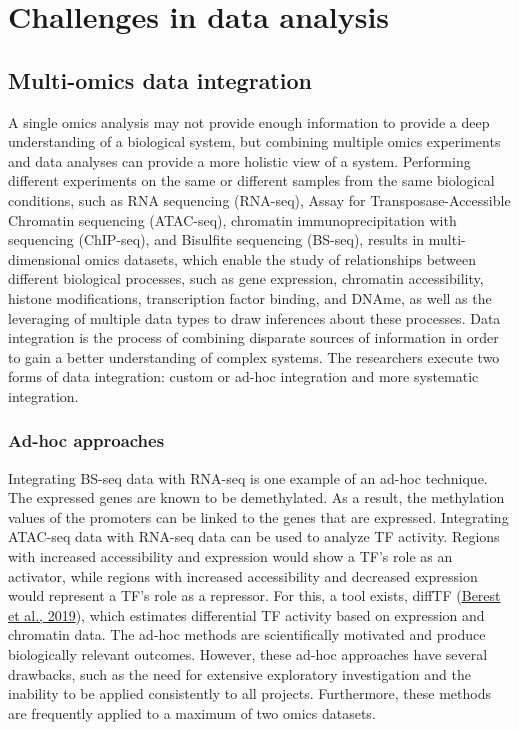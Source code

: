 \documentclass[12pt,twoside]{reedthesis}
\begin{document}
\hypertarget{challenges-in-data-analysis}{%
\section*{Challenges in data analysis}\label{challenges-in-data-analysis}}

\hypertarget{multi-omics-data-integration}{%
\subsection*{Multi-omics data integration}\label{multi-omics-data-integration}}

A single omics analysis may not provide enough information to provide a
deep understanding of a biological system, but combining multiple omics
experiments and data analyses can provide a more holistic view of a
system. Performing different experiments on the same or different
samples from the same biological conditions, such as RNA sequencing
(RNA-seq), Assay for Transposase-Accessible Chromatin sequencing
(ATAC-seq), chromatin immunoprecipitation with sequencing (ChIP-seq),
and Bisulfite sequencing (BS-seq), results in multi-dimensional omics
datasets, which enable the study of relationships between different
biological processes, such as gene expression, chromatin accessibility,
histone modifications, transcription factor binding, and DNAme, as well
as the leveraging of multiple data types to draw inferences about these
processes. Data integration is the process of combining disparate
sources of information in order to gain a better understanding of
complex systems. The researchers execute two forms of data integration:
custom or ad-hoc integration and more systematic integration.

\hypertarget{ad-hoc-approaches}{%
\subsubsection*{Ad-hoc approaches}\label{ad-hoc-approaches}}

Integrating BS-seq data with RNA-seq is one example of an ad-hoc
technique. The expressed genes are known to be demethylated. As a
result, the methylation values of the promoters can be linked to the
genes that are expressed. Integrating ATAC-seq data with RNA-seq data
can be used to analyze TF activity. Regions with increased accessibility
and expression would show a TF's role as an activator, while regions
with increased accessibility and decreased expression would represent a
TF's role as a repressor. For this, a tool exists, diffTF (\protect\hyperlink{ref-berest2019}{Berest et al., 2019}),
which estimates differential TF activity based on expression and
chromatin data. The ad-hoc methods are scientifically motivated and
produce biologically relevant outcomes. However, these ad-hoc approaches
have several drawbacks, such as the need for extensive exploratory
investigation and the inability to be applied consistently to all
projects. Furthermore, these methods are frequently applied to a maximum
of two omics datasets.
\end{document}
